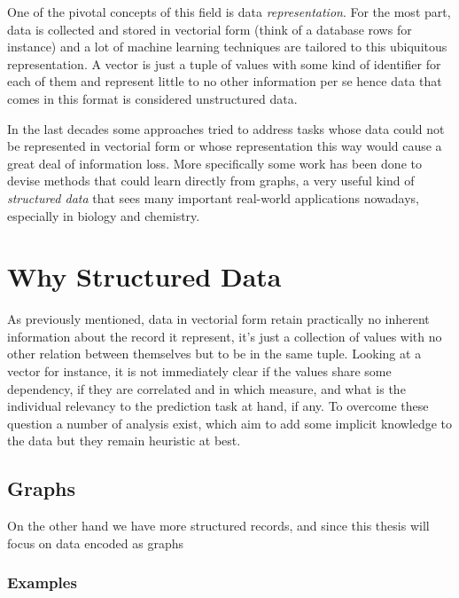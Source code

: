 One of the pivotal concepts of this field is data \emph{representation}.
For the most part, data is collected and stored in vectorial form (think of
a database rows for instance) and a lot of machine learning techniques are
tailored to this ubiquitous representation.
A vector is just a tuple of values with some kind of identifier for each of them
and represent little to no other information per se hence data that comes in
this format is considered unstructured data.

In the last decades some approaches tried to address tasks whose data could
not be represented in vectorial form or whose representation this way would cause
a great deal of information loss.
More specifically some work has been done to devise methods that could learn
directly from graphs, a very useful kind of \emph{structured data} that sees many
important real-world applications nowadays, especially in biology and chemistry.


\section{Why Structured Data}
As previously mentioned, data in vectorial form retain practically no inherent
information about the record it represent, it's just a collection of values with
no other relation between themselves but to be in the same tuple.
Looking at a vector for instance, it is not immediately clear if the values share
some dependency, if they are correlated and in which measure, and what is the
individual relevancy to the prediction task at hand, if any.
To overcome these question a number of analysis exist, which aim to add some
implicit knowledge to the data but they remain heuristic at best.

\subsection{Graphs}
On the other hand we have more structured records, and since this thesis will
focus on data encoded as graphs

\subsubsection{Examples}
\label{subsubsec:examples}


